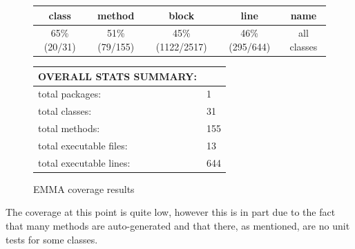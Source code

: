 \begin{figure}[ht]
\caption{EMMA coverage results}
\label{tab:emma4}
\begin{tabular}{| c | c | c | c | c |}
\hline
class & method & block & line & name \\ \hline
65\% (20/31) & 51\% (79/155) & 45\% (1122/2517) & 46\% (295/644) & all classes \\
\hline
\end{tabular}
\vspace{10pt}

\begin{tabular}{| l | l |}
\hline
OVERALL STATS SUMMARY: & \\ \hline
total packages: & 1 \\
total classes: & 31 \\
total methods: & 155 \\
total executable files: & 13 \\
total executable lines: & 644 \\
\hline
\end{tabular}
\end{figure}

The coverage at this point is quite low, however this is in part due to the fact that many methods are auto-generated and that there, as mentioned, are no unit tests for some classes.